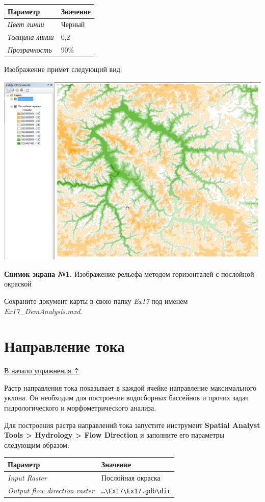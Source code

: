 \documentclass[]{book}
\theoremstyle{definition}
\theoremstyle{definition}
\theoremstyle{definition}
\theoremstyle{remark}
\begin{document}
\begin{enumerate}
  \begin{longtable}[]{@{}ll@{}}
  \toprule
  Параметр & Значение\tabularnewline
  \midrule
  \endhead
  \emph{Цвет линии} & Черный\tabularnewline
  \emph{Толщина линии} & 0,2\tabularnewline
  \emph{Прозрачность} & 90\%\tabularnewline
  \bottomrule
  \end{longtable}

  Изображение примет следующий вид:

  \includegraphics{images/Ex17/image10.png}
\end{enumerate}

\textbf{Снимок экрана №1.} Изображение рельефа методом горизонталей с
послойной окраской

Сохраните документ карты в свою папку \emph{Ex17} под именем
\emph{Ex17\_DemAnalysis.mxd}.

\hypertarget{dem-flowdir}{%
\section{Направление тока}\label{dem-flowdir}}

\protect\hyperlink{dem-analysis}{В начало упражнения ⇡}

Растр направления тока показывает в каждой ячейке направление
максимального уклона. Он необходим для построения водосборных бассейнов
и прочих задач гидрологического и морфометрического анализа.

Для построения растра направлений тока запустите инструмент
\textbf{Spatial Analyst Tools \textgreater{} Hydrology \textgreater{}
Flow Direction} и заполните его параметры следующим образом:

\begin{longtable}[]{@{}ll@{}}
\toprule
Параметр & Значение\tabularnewline
\midrule
\endhead
\emph{Input Raster} & Послойная окраска\tabularnewline
\emph{Output flow direction raster} &
\texttt{\ldots{}\textbackslash{}Ex17\textbackslash{}Ex17.gdb\textbackslash{}dir}\tabularnewline
\bottomrule
\end{longtable}
\end{document}
